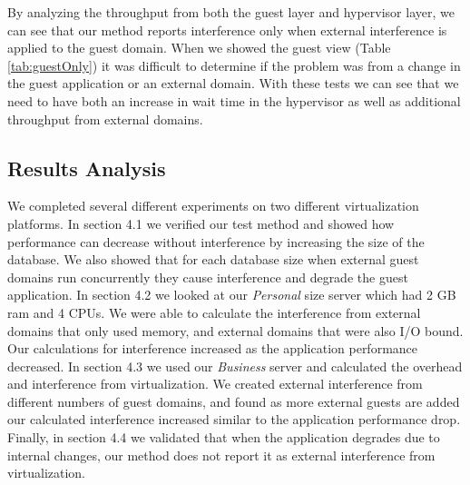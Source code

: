 By analyzing the throughput from both the guest layer and hypervisor layer, we can see that our method reports interference only when external interference is applied to the guest domain.  When we showed the guest view (Table \ref{tab:guestOnly}) it was difficult to determine if the problem was from a change in the guest application or an external domain.  With these tests we can see that we need to have both an increase in wait time in the hypervisor as well as additional throughput from external domains.


\subsection{Results Analysis}
We completed several different experiments on two different virtualization platforms.  In section 4.1 we verified our test method and showed how performance can decrease without interference by increasing the size of the database.  We also showed that for each database size when external guest domains run concurrently they cause interference and degrade the guest application.  In section 4.2 we looked at our \emph{Personal} size server which had 2 GB ram and 4 CPUs.  We were able to calculate the interference from external domains that only used memory, and external domains that were also I/O bound.  Our calculations for interference increased as the application performance decreased.  In section 4.3 we used our \emph{Business} server and calculated the overhead and interference from virtualization.  We created external interference from different numbers of guest domains, and found as more external guests are added our calculated interference increased similar to the application performance drop.  Finally, in section 4.4 we validated that when the application degrades due to internal changes, our method does not report it as external interference from virtualization.



